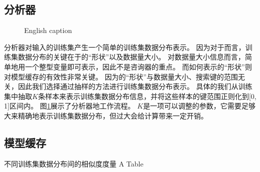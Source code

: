 
\subsection{分析器}

\begin{figure}[!htp]
  \centering
    {English caption}
  \label{fig:analyzer}
\end{figure}

分析器对输入的训练集产生一个简单的训练集数据分布表示。
因为对于{\li}而言，训练集数据分布的关键在于{\cdf}的``形状''以及数据量大小。
对数据量大小信息而言，简单地用一个整型变量即可表示，因此不是咨询器的重点。
而如何表示{\cdf}的``形状''则对模型缓存的有效性非常关键。
因为{\cdf}的``形状''与数据量大小、搜索键的范围无关，因此我们选择通过抽样的方法进行训练集数据分布表示。
具体的我们从训练集中抽取$K$条样本来表示训练集数据分布信息，并将这些样本的键范围正则化到[0, 1]区间内。
图\ref{fig:analyzer}展示了分析器地工作流程。
$K$是一项可以调整的参数，它需要足够大来精确地表示训练集数据分布，但过大会给计算带来一定开销。


\subsection{模型缓存}

\begin{table}[!hpb]
  \centering
  \bicaption[指向一个表格的表目录索引]
    {不同训练集数据分布间的相似度度量}
    {A Table}
  \label{tab:similarity}
  \begin{tabular}{@{}llr@{}} \toprule
  \end{tabular}
\end{table}

